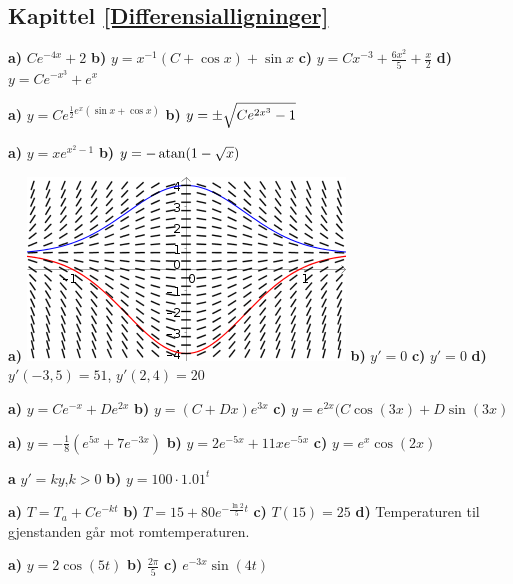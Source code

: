 




\subsection*{Kapittel \ref{Differensialligninger}}
\footnotesize

 \sel

\textbf{a)} $ Ce^{-4x}+2 $
\textbf{b)} $ y = x^{-1}(C+\cos x)+\sin x $
\textbf{c)} $ y = Cx^{-3} + \frac{6 x^2}{5} + \frac{x}{2} $ 
\textbf{d)} $ y = Ce^{-x^3}+e^x$

\textbf{a)} $ y= C e^{\frac{1}{2} e^x(\sin x + \cos x)} $
\textbf{b)} $ y= \pm\sqrt{\strut Ce^{2 x^3} - 1}$

\textbf{a)} $ y = xe^{x^2-1} $
\textbf{b)} $ y=-\operatorname{atan}(1-\sqrt{x}) $

\textbf{a)}
\includegraphics[scale=1.3]{retnfas} \textbf{b)} $ y'=0 $ \textbf{c)} $ y'=0 $ \textbf{d)} $ y'(-3, 5)=51 $, $ y'(2, 4)=20 $

\textbf{a)} $ y=Ce^{-x}+De^{2x} $ 
\textbf{b)} $ y= (C+Dx)e^{3x} $
\textbf{c)} $ y= e^{2x}(C\cos(3x)+D\sin(3x)$

\textbf{a)} $ y = -\frac{1}{8}\left(e^{5x}+7e^{-3x}\right) $
\textbf{b)} $ y=2e^{-5x}+11xe^{-5x} $
\textbf{c)} $ y= e^x\cos(2x) $

\textbf{a} $ y'=ky $\;,\;$ k>0 $ \textbf{b)} $ y = 100\cdot1.01^t $

\textbf{a)} $ T= T_a+Ce^{-kt} $
\textbf{b)} $ T=15+80e^{-\frac{\ln 2}{5}t}  $ \textbf{c)} $ T(15)=25 $ \textbf{d)} Temperaturen til gjenstanden går mot romtemperaturen.

 \sel

 \textbf{a)} $ y=2\cos(5t) $ \textbf{b)} $ \frac{2\pi}{5} $ \textbf{c)} $ e^{-3x}\sin(4t) $

